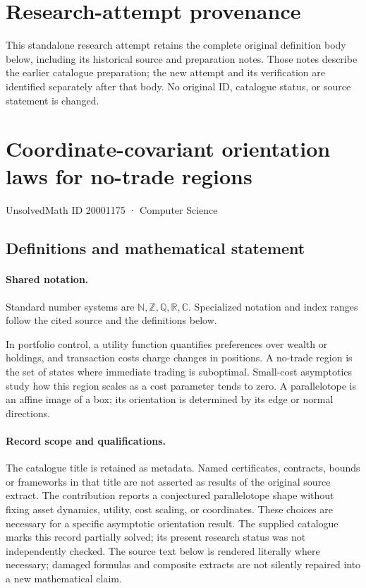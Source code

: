 \documentclass[11pt]{article}
\begin{document}
\section*{Research-attempt provenance}
This standalone research attempt retains the complete original definition body below,
including its historical source and preparation notes. Those notes describe the
earlier catalogue preparation; the new attempt and its verification are identified
separately after that body. No original ID, catalogue status, or source statement is changed.

\section{Coordinate-covariant orientation laws for no-trade regions}\label{20001175}
{\small UnsolvedMath ID 20001175 · Computer Science}
\subsection{Definitions and mathematical statement}

\paragraph{Shared notation.}Standard number systems are $\mathbb N,\mathbb Z,\mathbb Q,\mathbb R,\mathbb C$. Specialized notation and index ranges follow the cited source and the definitions below.


In portfolio control, a utility function quantifies preferences over wealth or holdings, and transaction costs charge changes in positions. A no-trade region is the set of states where immediate trading is suboptimal. Small-cost asymptotics study how this region scales as a cost parameter tends to zero. A parallelotope is an affine image of a box; its orientation is determined by its edge or normal directions.
\paragraph{Record scope and qualifications.}
The catalogue title is retained as metadata. Named certificates, contracts, bounds or frameworks in that title are not asserted as results of the original source extract.
The contribution reports a conjectured parallelotope shape without fixing asset dynamics, utility, cost scaling, or coordinates. These choices are necessary for a specific asymptotic orientation result. The supplied catalogue marks this record partially solved; its present research status was not independently checked.
The source text below is rendered literally where necessary; damaged formulas and composite extracts are not silently repaired into a new mathematical claim.
\end{document}
